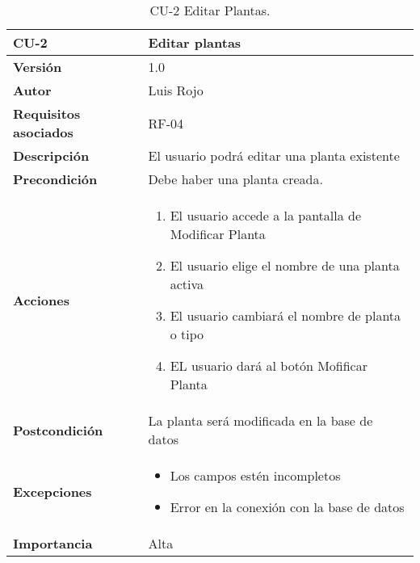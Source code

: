 \begin{table}[p]
	\centering
	\begin{tabularx}{\linewidth}{ p{} p{} }
		\toprule
		\textbf{CU-2}    & \textbf{Editar plantas}\\
		\toprule
		\textbf{Versión}              & 1.0    \\
		\textbf{Autor}                & Luis Rojo \\
		\textbf{Requisitos asociados} & RF-04 \\
		\textbf{Descripción}          & El usuario podrá editar una planta existente \\
		\textbf{Precondición}         &  Debe haber una planta creada. \\
		\textbf{Acciones}             &
		\begin{enumerate}
			\def\labelenumi{\arabic{enumi}.}
			\tightlist
			\item El usuario accede a la pantalla de Modificar Planta
			\item El usuario elige el nombre de una planta activa
                \item El usuario cambiará el nombre de planta o tipo
                \item EL usuario dará al botón Mofificar Planta
		\end{enumerate}\\
		\textbf{Postcondición}        & La planta será modificada en la base de datos \\
		\textbf{Excepciones}          & 
            \begin{itemize}
                \item Los campos estén incompletos
                \item Error en la conexión con la base de datos
            \end{itemize}\\
		\textbf{Importancia}          & Alta  \\
		\bottomrule
	\end{tabularx}
	\caption{CU-2 Editar Plantas.}
\end{table}


